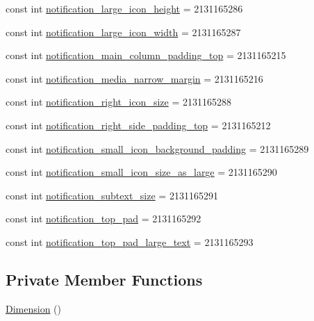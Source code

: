 \begin{CompactItemize}
const int \hyperlink{class__2doo_1_1_droid_1_1_resource_1_1_dimension_e96ed53184249f410a06b8cfdc46e8ac}{notification\_\-large\_\-icon\_\-height} = 2131165286
\item 
const int \hyperlink{class__2doo_1_1_droid_1_1_resource_1_1_dimension_bf449fb94eda81514471c268c290cbda}{notification\_\-large\_\-icon\_\-width} = 2131165287
\item 
const int \hyperlink{class__2doo_1_1_droid_1_1_resource_1_1_dimension_d70a8cb0d83d694a4a915e92fb6e6025}{notification\_\-main\_\-column\_\-padding\_\-top} = 2131165215
\item 
const int \hyperlink{class__2doo_1_1_droid_1_1_resource_1_1_dimension_2765f6d86ba35eef8bdd56dda2a8e6ad}{notification\_\-media\_\-narrow\_\-margin} = 2131165216
\item 
const int \hyperlink{class__2doo_1_1_droid_1_1_resource_1_1_dimension_df18c2cfa24fa2ac7a840665a2656781}{notification\_\-right\_\-icon\_\-size} = 2131165288
\item 
const int \hyperlink{class__2doo_1_1_droid_1_1_resource_1_1_dimension_45077d8c4e3118c5494171810104252a}{notification\_\-right\_\-side\_\-padding\_\-top} = 2131165212
\item 
const int \hyperlink{class__2doo_1_1_droid_1_1_resource_1_1_dimension_8a96eea57e7cbbf1251997de49d82e06}{notification\_\-small\_\-icon\_\-background\_\-padding} = 2131165289
\item 
const int \hyperlink{class__2doo_1_1_droid_1_1_resource_1_1_dimension_2ba8c902ac7de503784dac04612cde73}{notification\_\-small\_\-icon\_\-size\_\-as\_\-large} = 2131165290
\item 
const int \hyperlink{class__2doo_1_1_droid_1_1_resource_1_1_dimension_d3ff32424ad6f627d20f04def2428e87}{notification\_\-subtext\_\-size} = 2131165291
\item 
const int \hyperlink{class__2doo_1_1_droid_1_1_resource_1_1_dimension_01094fe3a1146a018d4c13f2f22c326b}{notification\_\-top\_\-pad} = 2131165292
\item 
const int \hyperlink{class__2doo_1_1_droid_1_1_resource_1_1_dimension_59bff3aeb31bff508874328d7c65277c}{notification\_\-top\_\-pad\_\-large\_\-text} = 2131165293
\end{CompactItemize}
\subsection*{Private Member Functions}
\begin{CompactItemize}
\item 
\hyperlink{class__2doo_1_1_droid_1_1_resource_1_1_dimension_daae10d0dc9738b47afe3cd46de794bd}{Dimension} ()
\end{CompactItemize}

